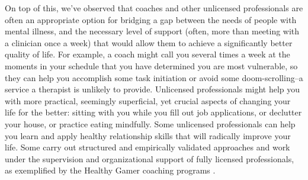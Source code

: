 \documentclass[12pt,letterpaper]{book}
\begin{document}
On top of this, we've observed that coaches and other unlicensed professionals are often an appropriate option for bridging a gap between the needs of people with mental illness, and the necessary level of support (often, more than meeting with a clinician once a week) that would allow them to achieve a significantly better quality of life. For example, a coach might call you several times a week at the moments in your schedule that you have determined you are most vulnerable, so they can help you accomplish some task initiation or avoid some doom-scrolling–a service a therapist is unlikely to provide. Unlicensed professionals might help you with more practical, seemingly superficial, yet crucial aspects of changing your life for the better: sitting with you while you fill out job applications, or declutter your house, or practice eating mindfully. Some unlicensed professionals can help you learn and apply healthy relationship skills that will radically improve your life. Some carry out structured and empirically validated approaches and work under the supervision and organizational support of fully licensed professionals, as exemplified by the Healthy Gamer coaching programs \cite{healthyGamerMethodology}.
\end{document}
